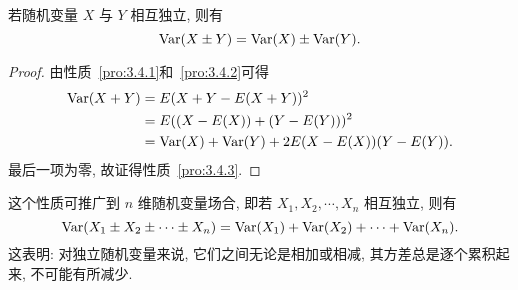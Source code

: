   \begin{property}\label{pro:3.4.3}
  	若随机变量 $X$ 与 $Y$ 相互独立, 则有
  	\begin{equation*}
  		\operatorname{Var}(X\pm Y)=\operatorname{Var}(X)\pm\operatorname{Var}(Y).
  	\end{equation*}
  	\begin{proof}
  		由性质~\ref{pro:3.4.1}和~\ref{pro:3.4.2}可得
  		\begin{align*}
  			\operatorname{Var}(X+Y)&=E(X+Y-E(X+Y))^2\\
  			&=E((X-E(X))+(Y-E(Y)))^2\\
  			&=\operatorname{Var}(X)+\operatorname{Var}(Y)+2E(X-E(X))(Y-E(Y)).
  		\end{align*}
  		最后一项为零, 故证得性质~\ref{pro:3.4.3}.
  	\end{proof}
    这个性质可推广到 $n$ 维随机变量场合, 即若 $X_{1}, X_{2}, \cdots, X_{n}$ 相互独立, 则有
       \begin{equation}\label{eq:3.4.6}
         \Var\left(X_{1} \pm X_{2} \pm \cdots \pm X_{n}\right)=\Var\left(X_{1}\right)+\Var\left(X_{2}\right)+\cdots+\Var\left(X_{n}\right).
       \end{equation}
       这表明: 对独立随机变量来说, 它们之间无论是相加或相减, 其方差总是逐个累积起来, 不可能有所减少.
  \end{property}

